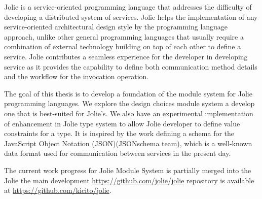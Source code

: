 Jolie\cite{JOLIE} is a service-oriented programming language that addresses the difficulty of developing a distributed system of services. Jolie helps the implementation of any service-oriented architectural design style by the programming language approach, unlike other general programming languages that usually require a combination of external technology building on top of each other to define a service. Jolie contributes a seamless experience for the developer in developing service as it provides the capability to define both communication method details and the workflow for the invocation operation.

The goal of this thesis is to develop a foundation of the module system for Jolie programming languages. We explore the design choices module system a develop one that is best-suited for Jolie's. We also have an experimental implementation of enhancement in Jolie type system to allow Jolie developer to define value constraints for a type. It is inspired by the work defining a schema for the JavaScript Object Notation (JSON)(JSONschema team), which is a well-known
data format used for communication between services in the present day.

The current work progress for Jolie Module System is partially merged into the Jolie the main development \url{https://github.com/jolie/jolie} repository is available at \url{https://github.com/kicito/jolie}.

% 
% 





